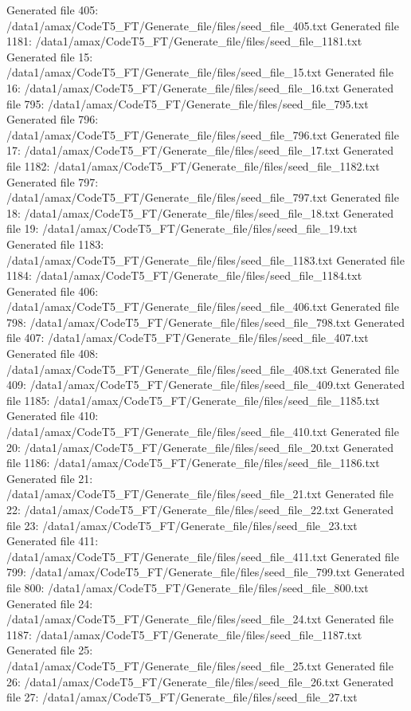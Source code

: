 Generated file 405: /data1/amax/CodeT5_FT/Generate_file/files/seed_file_405.txt
Generated file 1181: /data1/amax/CodeT5_FT/Generate_file/files/seed_file_1181.txt
Generated file 15: /data1/amax/CodeT5_FT/Generate_file/files/seed_file_15.txt
Generated file 16: /data1/amax/CodeT5_FT/Generate_file/files/seed_file_16.txt
Generated file 795: /data1/amax/CodeT5_FT/Generate_file/files/seed_file_795.txt
Generated file 796: /data1/amax/CodeT5_FT/Generate_file/files/seed_file_796.txt
Generated file 17: /data1/amax/CodeT5_FT/Generate_file/files/seed_file_17.txt
Generated file 1182: /data1/amax/CodeT5_FT/Generate_file/files/seed_file_1182.txt
Generated file 797: /data1/amax/CodeT5_FT/Generate_file/files/seed_file_797.txt
Generated file 18: /data1/amax/CodeT5_FT/Generate_file/files/seed_file_18.txt
Generated file 19: /data1/amax/CodeT5_FT/Generate_file/files/seed_file_19.txt
Generated file 1183: /data1/amax/CodeT5_FT/Generate_file/files/seed_file_1183.txt
Generated file 1184: /data1/amax/CodeT5_FT/Generate_file/files/seed_file_1184.txt
Generated file 406: /data1/amax/CodeT5_FT/Generate_file/files/seed_file_406.txt
Generated file 798: /data1/amax/CodeT5_FT/Generate_file/files/seed_file_798.txt
Generated file 407: /data1/amax/CodeT5_FT/Generate_file/files/seed_file_407.txt
Generated file 408: /data1/amax/CodeT5_FT/Generate_file/files/seed_file_408.txt
Generated file 409: /data1/amax/CodeT5_FT/Generate_file/files/seed_file_409.txt
Generated file 1185: /data1/amax/CodeT5_FT/Generate_file/files/seed_file_1185.txt
Generated file 410: /data1/amax/CodeT5_FT/Generate_file/files/seed_file_410.txt
Generated file 20: /data1/amax/CodeT5_FT/Generate_file/files/seed_file_20.txt
Generated file 1186: /data1/amax/CodeT5_FT/Generate_file/files/seed_file_1186.txt
Generated file 21: /data1/amax/CodeT5_FT/Generate_file/files/seed_file_21.txt
Generated file 22: /data1/amax/CodeT5_FT/Generate_file/files/seed_file_22.txt
Generated file 23: /data1/amax/CodeT5_FT/Generate_file/files/seed_file_23.txt
Generated file 411: /data1/amax/CodeT5_FT/Generate_file/files/seed_file_411.txt
Generated file 799: /data1/amax/CodeT5_FT/Generate_file/files/seed_file_799.txt
Generated file 800: /data1/amax/CodeT5_FT/Generate_file/files/seed_file_800.txt
Generated file 24: /data1/amax/CodeT5_FT/Generate_file/files/seed_file_24.txt
Generated file 1187: /data1/amax/CodeT5_FT/Generate_file/files/seed_file_1187.txt
Generated file 25: /data1/amax/CodeT5_FT/Generate_file/files/seed_file_25.txt
Generated file 26: /data1/amax/CodeT5_FT/Generate_file/files/seed_file_26.txt
Generated file 27: /data1/amax/CodeT5_FT/Generate_file/files/seed_file_27.txt
